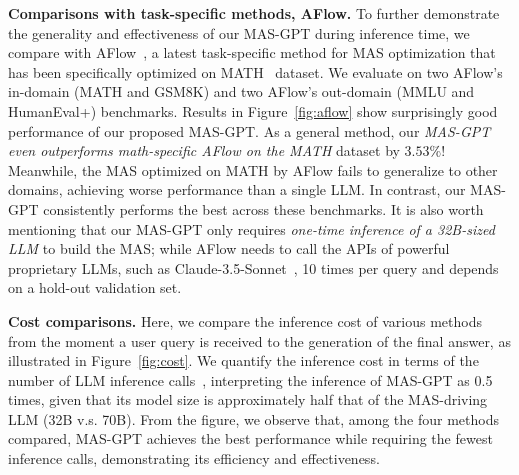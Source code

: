 \documentclass{article}
\theoremstyle{plain}
\theoremstyle{definition}
\theoremstyle{remark}
\begin{document}
\textbf{Comparisons with task-specific methods, AFlow.}
To further demonstrate the generality and effectiveness of our MAS-GPT during inference time, we compare with AFlow~\cite{zhang2024aflow}, a latest task-specific method for MAS optimization that has been specifically optimized on MATH~\cite{hendrycksmath2021} dataset.
We evaluate on two AFlow's in-domain (MATH and GSM8K) and two AFlow's out-domain (MMLU and HumanEval+) benchmarks.
Results in Figure~\ref{fig:aflow} show surprisingly good performance of our proposed MAS-GPT.
As a general method, our \textit{MAS-GPT even outperforms math-specific AFlow on the MATH} dataset by $3.53\%$!
Meanwhile, the MAS optimized on MATH by AFlow fails to generalize to other domains, achieving worse performance than a single LLM.
In contrast, our MAS-GPT consistently performs the best across these benchmarks.
It is also worth mentioning that our MAS-GPT only requires \textit{one-time inference of a 32B-sized LLM} to build the MAS; while AFlow needs to call the APIs of powerful proprietary LLMs, such as Claude-3.5-Sonnet~\cite{claude3.5}, 10 times per query and depends on a hold-out validation set.

\textbf{Cost comparisons.}
Here, we compare the inference cost of various methods from the moment a user query is received to the generation of the final answer, as illustrated in Figure~\ref{fig:cost}.
We quantify the inference cost in terms of the number of LLM inference calls~\cite{liu2024dynamic}, interpreting the inference of MAS-GPT as 0.5 times, given that its model size is approximately half that of the MAS-driving LLM (32B v.s. 70B).
From the figure, we observe that, among the four methods compared, MAS-GPT achieves the best performance while requiring the fewest inference calls, demonstrating its efficiency and effectiveness.






\end{document}
